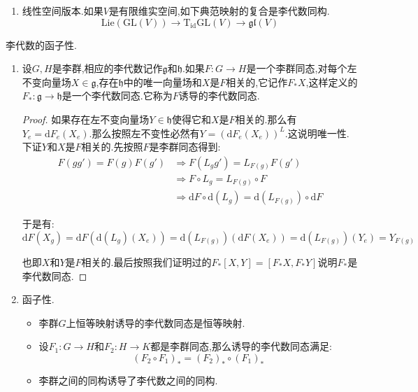 \begin{enumerate}
\begin{proof}
		于是有:$$[A^L,B^L]_{I_n}=\sum_{i,k,r}\left(A_k^iB_r^k-B_k^iA_r^k\right)\frac{\partial}{\partial X_r^i}\mid_{I_n}$$
		
		此即对应于$[A,B]$的切向量.按照左不变性质,$[A^L,B^L]$被它在幺元处的取值决定,这导致$[A^L,B^L]=[A,B]^L$.
	\end{proof}
    \item 线性空间版本.如果$V$是有限维实空间,如下典范映射的复合是李代数同构.
    $$\mathrm{Lie}(\mathrm{GL}(V))\to\mathrm{T}_{\mathrm{id}}\mathrm{GL}(V)\to\mathfrak{gl}(V)$$
\end{enumerate}

李代数的函子性.
\begin{enumerate}
	\item 设$G,H$是李群,相应的李代数记作$\mathfrak{g}$和$\mathfrak{h}$.如果$F:G\to H$是一个李群同态,对每个左不变向量场$X\in\mathfrak{g}$,存在$\mathfrak{h}$中的唯一向量场和$X$是$F$相关的,它记作$F_*X$,这样定义的$F_*:\mathfrak{g}\to\mathfrak{h}$是一个李代数同态.它称为$F$诱导的李代数同态.
	\begin{proof}
		
		如果存在左不变向量场$Y\in\mathfrak{h}$使得它和$X$是$F$相关的.那么有$Y_e=\mathrm{d}F_e(X_e)$.那么按照左不变性必然有$Y=(\mathrm{d}F_e(X_e))^L$.这说明唯一性.下证$Y$和$X$是$F$相关的.先按照$F$是李群同态得到:
		\begin{align*}
		F(gg')=F(g)F(g')&\Rightarrow F(L_gg')=L_{F(g)}F(g')\\&\Rightarrow F\circ L_g=L_{F(g)}\circ F\\&\Rightarrow\mathrm{d}F\circ\mathrm{d}(L_g)=\mathrm{d}(L_{F(g)})\circ\mathrm{d}F
		\end{align*}
		
		于是有:
		$$\mathrm{d}F(X_g)=\mathrm{d}F(\mathrm{d}(L_g)(X_e))=\mathrm{d}(L_{F(g)})(\mathrm{d}F(X_e))=\mathrm{d}(L_{F(g)})(Y_e)=Y_{F(g)}$$
		
		也即$X$和$Y$是$F$相关的.最后按照我们证明过的$F_*[X,Y]=[F_*X,F_*Y]$说明$F_*$是李代数同态.
	\end{proof}
    \item 函子性.
    \begin{itemize}
    	\item 李群$G$上恒等映射诱导的李代数同态是恒等映射.
    	\item 设$F_1:G\to H$和$F_2:H\to K$都是李群同态,那么诱导的李代数同态满足:
    	$$(F_2\circ F_1)_*=(F_2)_*\circ(F_1)_*$$
    	\item 李群之间的同构诱导了李代数之间的同构.
    \end{itemize}
\end{enumerate}

